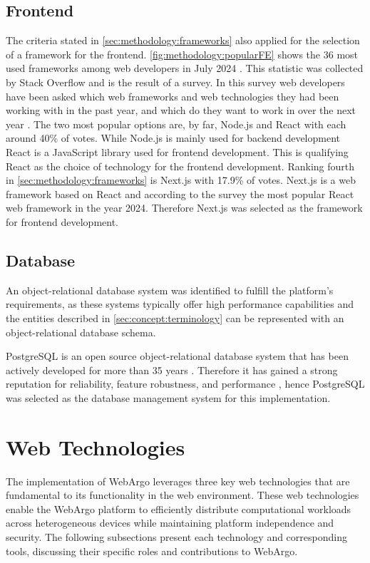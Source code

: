 \subsection{Frontend}
\label{subsec:methodology:frameworks:frontend}
The criteria stated in \autoref{sec:methodology:frameworks} also applied for the selection of a framework for the frontend. \autoref{fig:methodology:popularFE} shows the 36 most used frameworks among web developers in July 2024 \cite{frontend:popularity}. This statistic was collected by Stack Overflow and is the result of a survey. In this survey web developers have been asked which web frameworks and web technologies they had been working with in the past year, and which do they want to work in over the next year \cite{frontend:popularity}. The two most popular options are, by far, Node.js and React with each around 40\% of votes. While Node.js is mainly used for backend development React is a JavaScript library used for frontend development. This is qualifying React as the choice of technology for the frontend development. Ranking fourth in \autoref{sec:methodology:frameworks} is Next.js with 17.9\% of votes. Next.js is a web framework based on React \cite{methodology:nextjs} and according to the survey the most popular React web framework in the year 2024. Therefore Next.js was selected as the framework for frontend development.

\subsection{Database}
An object-relational database system was identified to fulfill the platform's requirements, as these systems typically offer high performance capabilities and the entities described in \autoref{sec:concept:terminology} can be represented with an object-relational database schema.

PostgreSQL is an open source object-relational database system that has been actively developed for more than 35 years \cite{methodology:db}. Therefore it has gained a strong reputation for reliability, feature robustness, and performance \cite{methodology:db}, hence PostgreSQL was selected as the database management system for this implementation.

\section{Web Technologies}
\label{sec:methodology:technologies}
The implementation of WebArgo leverages three key web technologies that are fundamental to its functionality in the web environment. These web technologies enable the WebArgo platform to efficiently distribute computational workloads across heterogeneous devices while maintaining platform independence and security. The following subsections present each technology and corresponding tools, discussing their specific roles and contributions to WebArgo.


